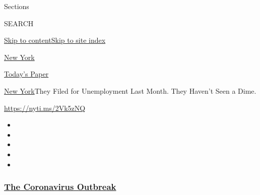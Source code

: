 Sections

SEARCH

\protect\hyperlink{site-content}{Skip to
content}\protect\hyperlink{site-index}{Skip to site index}

\href{https://www.nytimes3xbfgragh.onion/section/nyregion}{New York}

\href{https://myaccount.nytimes3xbfgragh.onion/auth/login?response_type=cookie\&client_id=vi}{}

\href{https://www.nytimes3xbfgragh.onion/section/todayspaper}{Today's
Paper}

\href{/section/nyregion}{New York}\textbar{}They Filed for Unemployment
Last Month. They Haven't Seen a Dime.

\url{https://nyti.ms/2Vk5zNQ}

\begin{itemize}
\item
\item
\item
\item
\item
\end{itemize}

\hypertarget{the-coronavirus-outbreak}{%
\subsubsection{\texorpdfstring{\href{https://www.nytimes3xbfgragh.onion/news-event/coronavirus?name=styln-coronavirus-national\&region=TOP_BANNER\&variant=undefined\&block=storyline_menu_recirc\&action=click\&pgtype=Article\&impression_id=6d1a4100-e399-11ea-8ff5-fbf1b2be4040}{The
Coronavirus
Outbreak}}{The Coronavirus Outbreak}}\label{the-coronavirus-outbreak}}

